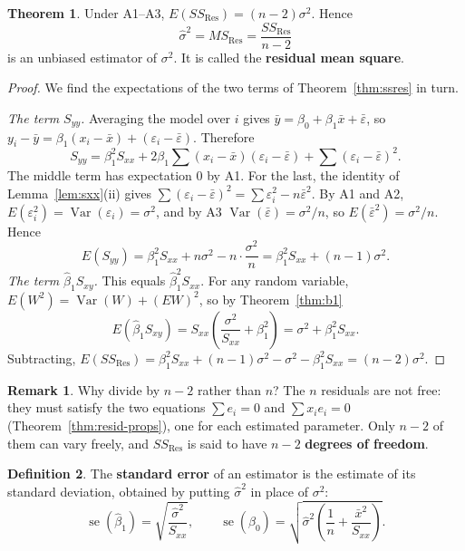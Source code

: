 \documentclass[11pt,a4paper]{article}
\numberwithin{equation}{section}
\theoremstyle{definition}
\newtheorem{thm}{Theorem}[subsection]
\newtheorem{defn}[thm]{Definition}
\newtheorem*{remark}{Remark}
\begin{document}
\begin{thm}\label{thm:e-ssres}
Under A1--A3, $E(SS_{\mathrm{Res}}) = (n-2)\sigma^2$. Hence
\[
\boxed{\;\hat\sigma^2 = MS_{\mathrm{Res}} = \frac{SS_{\mathrm{Res}}}{n-2}\;}
\]
is an unbiased estimator of $\sigma^2$. It is called the \textbf{residual mean square}.
\end{thm}

\begin{proof}
We find the expectations of the two terms of Theorem~\ref{thm:ssres} in turn.

\emph{The term $S_{yy}$.} Averaging the model over $i$ gives
$\bar y = \beta_0 + \beta_1 \bar x + \bar\varepsilon$, so
$y_i - \bar y = \beta_1 (x_i - \bar x) + (\varepsilon_i - \bar\varepsilon)$. Therefore
\[
S_{yy} = \beta_1^2 S_{xx} + 2\beta_1 \sum (x_i - \bar x)(\varepsilon_i - \bar\varepsilon)
       + \sum (\varepsilon_i - \bar\varepsilon)^2 .
\]
The middle term has expectation $0$ by A1. For the last, the identity of
Lemma~\ref{lem:sxx}(ii) gives $\sum (\varepsilon_i - \bar\varepsilon)^2 = \sum \varepsilon_i^2 - n\bar\varepsilon^2$.
By A1 and A2, $E(\varepsilon_i^2) = \operatorname{Var}(\varepsilon_i) = \sigma^2$, and by A3
$\operatorname{Var}(\bar\varepsilon) = \sigma^2/n$, so $E(\bar\varepsilon^2) = \sigma^2/n$. Hence
\[
E(S_{yy}) = \beta_1^2 S_{xx} + n\sigma^2 - n\cdot\frac{\sigma^2}{n} = \beta_1^2 S_{xx} + (n-1)\sigma^2 .
\]
\emph{The term $\hat\beta_1 S_{xy}$.} This equals $\hat\beta_1^2 S_{xx}$. For any random
variable, $E(W^2) = \operatorname{Var}(W) + \left(E W\right)^2$, so by Theorem~\ref{thm:b1}
\[
E(\hat\beta_1 S_{xy}) = S_{xx} \left( \frac{\sigma^2}{S_{xx}} + \beta_1^2 \right) = \sigma^2 + \beta_1^2 S_{xx} .
\]
Subtracting,
$E(SS_{\mathrm{Res}}) = \beta_1^2 S_{xx} + (n-1)\sigma^2 - \sigma^2 - \beta_1^2 S_{xx} = (n-2)\sigma^2$.
\end{proof}

\begin{remark}
Why divide by $n - 2$ rather than $n$? The $n$ residuals are not free: they must satisfy the
two equations $\sum e_i = 0$ and $\sum x_i e_i = 0$ (Theorem~\ref{thm:resid-props}), one for
each estimated parameter. Only $n - 2$ of them can vary freely, and $SS_{\mathrm{Res}}$ is
said to have $n - 2$ \textbf{degrees of freedom}.
\end{remark}

\begin{defn}
The \textbf{standard error} of an estimator is the estimate of its standard deviation,
obtained by putting $\hat\sigma^2$ in place of $\sigma^2$:
\[
\operatorname{se}(\hat\beta_1) = \sqrt{\frac{\hat\sigma^2}{S_{xx}}}, \qquad
\operatorname{se}(\hat\beta_0) = \sqrt{\hat\sigma^2 \left( \frac1n + \frac{\bar x^2}{S_{xx}} \right)} .
\]
\end{defn}
\end{document}
